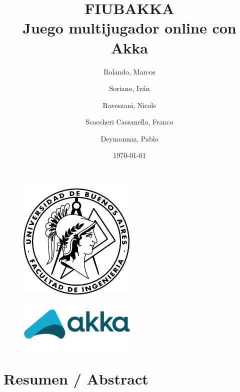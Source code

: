 \documentclass[12pt]{article}
\begin{document}
\title{\textbf{FIUBAKKA} \\ \large \textbf{Juego multijugador online con Akka}}
\author{
    Rolando, Marcos
    \and
    Soriano, Iván
    \and
    Raveszani, Nicole
    \and
    Scaccheri Cassanello, Franco
    \and
    Deymonnaz, Pablo
}
\date{\today}

\maketitle %

\thispagestyle{empty}

\begin{figure}[htbp]
    \centering
    \includegraphics[width=0.5\textwidth]{../assets/fiuba-logo.png}
\end{figure}
\begin{figure}[htbp]
    \centering
    \includegraphics[width=0.5\textwidth]{../assets/akka-toolkit-logo.png}
\end{figure}

\newpage
\thispagestyle{empty}
\tableofcontents
\newpage

\setcounter{page}{1} %

\section{Resumen / Abstract}



\vspace{5mm} %
\end{document}
